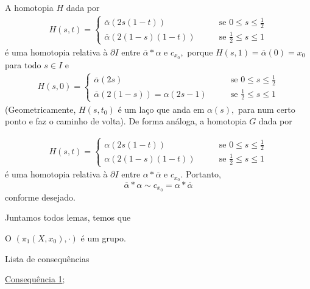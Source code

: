 \begin{dem}
    A homotopia $H$ dada por 
    \begin{align*}
        H(s,t)=\begin{cases}
            \overline{\alpha}(2s(1-t))\;\;\;&\;\;\;\mbox{ se }0\le s \le \frac{1}{2}\\
            \overline{\alpha}(2(1-s)(1-t)) \;\;\;&\;\;\;\mbox{ se }\frac{1}{2}\le s\le 1 
        \end{cases}
    \end{align*}
    é uma homotopia relativa à $\partial I$ entre $\overline{\alpha}*\alpha$ e $c_{x_0},$ porque $H(s,1)=\overline{\alpha}(0)=x_0$ para todo $s\in I$ e 
    \begin{align*}
        H(s,0)=\begin{cases}
            \overline{\alpha}(2s)\;\;\;&\;\;\;\mbox{ se }0\le s \le \frac{1}{2}\\
            \overline{\alpha}(2(1-s))=\alpha(2s-1) \;\;\;&\;\;\;\mbox{ se }\frac{1}{2}\le s\le 1
        \end{cases}
    \end{align*}
    (Geometricamente, $H(s,t_0)$ é um laço que anda em $\alpha(s),$ para num certo ponto e faz o caminho de volta).
    De forma análoga, a homotopia $G$ dada por 
   
\begin{align*}
        H(s,t)=\begin{cases}
            \alpha(2s(1-t))\;\;\;&\;\;\;\mbox{ se }0\le s \le \frac{1}{2} \\
            \alpha(2(1-s)(1-t)) \;\;\;&\;\;\;\mbox{ se }\frac{1}{2}\le s\le 1 
        \end{cases}
    \end{align*}
    é uma homotopia relativa à $\partial I$ entre $\alpha*\overline{\alpha}$ e $c_{x_0}.$ Portanto, $$\overline{\alpha}*\alpha\sim c_{x_0}=\alpha*\overline{\alpha}$$ conforme desejado.
\end{dem}

Juntamos todos lemas, temos que 

\begin{thm}
    O $(\pi_1(X,x_0),\cdot)$ é um grupo.
\end{thm}

\begin{titlemize}{Lista de consequências}
	\item \hyperref[grupo-fundamental-def]{Consequência 1};\\ %
\end{titlemize}
